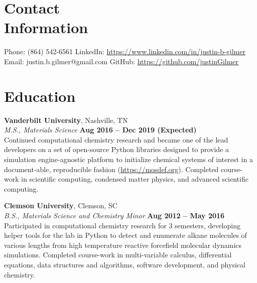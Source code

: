 \documentclass[margin,line]{resume}
\begin{document}
\begin{resume}
    \section{\mysidestyle Contact\\Information}

    Phone: (864) 542-6561           \hfill LinkedIn: \url{https://www.linkedin.com/in/justin-b-gilmer}\\
    \noindent Email: justin.b.gilmer@gmail.com  \hfill GitHub: \url{https://github.com/justinGilmer}\vspace{0mm}\\\vspace{-4.5mm}

    \section{\mysidestyle Education}

    \textbf{Vanderbilt University}, Nashville, TN \vspace{2mm}\\\vspace{1mm}%
    \textsl{M.S., Materials Science} \hfill \textbf{Aug 2016 -- Dec 2019 (Expected)}\\
   Continued computational chemistry research and became one of the lead developers on a set of open-source Python libraries designed to provide a simulation engine-agnostic platform to initialize chemical systems of interest in a document-able, reproducible fashion (\url{https://mosdef.org}). Completed course-work in scientific computing, condensed matter physics, and advanced scientific computing.


    \textbf{Clemson University}, Clemson, SC \vspace{2mm}\\\vspace{1mm}%
    \textsl{B.S., Materials Science and Chemistry Minor} \hfill \textbf{Aug 2012 -- May 2016}\\
    Participated in computational chemistry research for 3 semesters, developing helper tools for the lab in Python to detect and enumerate alkane molecules of various lengths from high temperature reactive forcefield molecular dynamics simulations.
    Completed course-work in multi-variable calculus, differential equations, data structures and algorithms, software development, and physical chemistry.


\end{resume}
\end{document}
